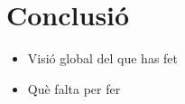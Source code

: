 \section{Conclusió}
\begin{itemize}
    \item Visió global del que has fet
    \item Què falta per fer
\end{itemize}